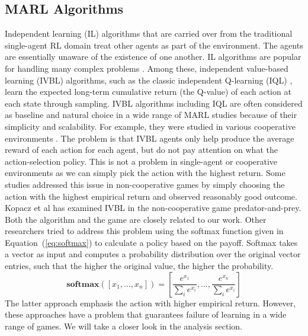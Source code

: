 \documentclass[]{interact}
\theoremstyle{plain}%
\theoremstyle{definition}
\theoremstyle{remark}
\begin{document}
\subsection{MARL Algorithms}
Independent learning (IL) algorithms that are carried over from the traditional single-agent RL domain treat other agents as part of the environment. The agents are essentially unaware of the existence of one another. IL algorithms are popular for handling many complex problems \cite{papoudakis2020benchmarking, gupta2017cooperative, de2020independent, palmer2020independent}. Among these, independent value-based learning (IVBL) algorithms, such as the classic independent Q-learning (IQL) \cite{tan1993multi}, learn the expected long-term cumulative return (the Q-value) of each action at each state through sampling. IVBL algorithms including IQL are often considered as baseline and natural choice in a wide range of MARL studies because of their simplicity and scalability. For example, they were studied in various cooperative environments \cite{foerster2017stabilising, omidshafiei2017deep, palmer2017lenient, palmer2018negative}. The problem is that IVBL agents only help produce the average reward of each action for each agent, but do not pay attention on what the action-selection policy. This is not a problem in single-agent or cooperative environments as we can simply pick the action with the highest return. Some studies addressed this issue in non-cooperative games by simply choosing the action with the highest empirical return \cite{bjornsson2009cadiaplayer, jiang2018q, kopacz2023evaluating} and observed reasonably good outcome. Kopacz et al \cite{kopacz2023evaluating} has examined IVBL in the non-cooperative game predator-and-prey. Both the algorithm and the game are closely related to our work. Other researchers \cite{qu2020distributed} tried to address this problem using the softmax function given in Equation~(\ref{eq:softmax}) to calculate a policy based on the payoff. Softmax takes a vector as input and computes a probability distribution over the original vector entries, such that the higher the original value, the higher the probability.
\begin{equation}
    \textbf{softmax}([x_1, ..., x_n]) = [\frac{e^{x_1}}{\sum_{i}{e^{x_i}}}, ..., \frac{e^{x_n}}{\sum_{i}{e^{x_i}}}]
    \label{eq:softmax}
\end{equation}
The latter approach emphasis the action with higher empirical return. However, these approaches have a problem that guarantees failure of learning in a wide range of games. We will take a closer look in the analysis section.
\end{document}
